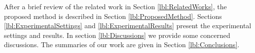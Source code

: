 \documentclass[review]{elsarticle}
\begin{document}
After a brief review of the related work in Section \ref{lbl:RelatedWorks}, the proposed method is described in Section \ref{lbl:ProposedMethod}. Sections \ref{lbl:ExperimentalSettings} and \ref{lbl:ExperimentalResults} present the experimental settings and results. In section \ref{lbl:Discussions} we provide some concerned discussions. The summaries of our work are given in Section \ref{lbl:Conclusions}.


\end{document}
